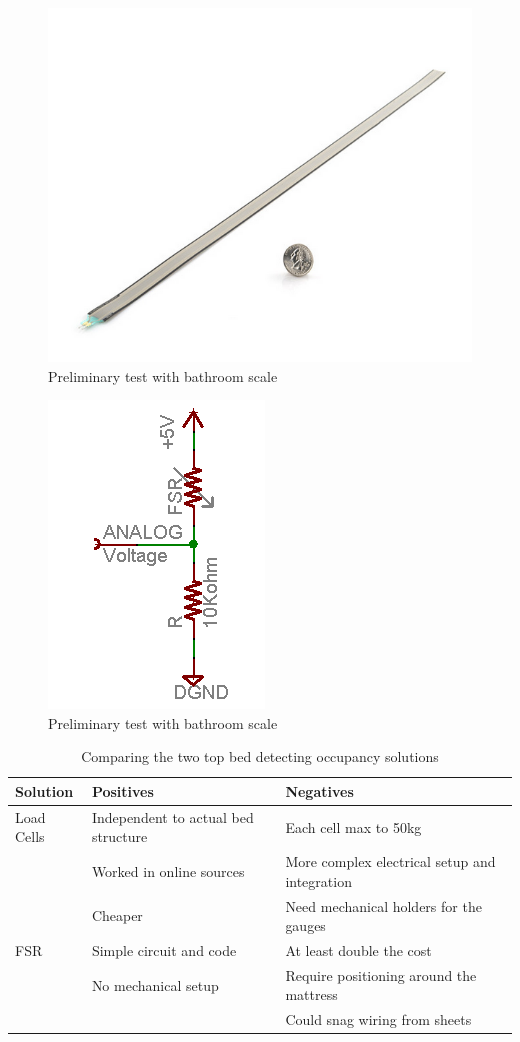 \documentclass[11pt]{article}
\begin{document}
\begin{figure}[H]
	\centering
	\includegraphics[width = 0.3\linewidth]{FSR}
	\caption{Preliminary test with bathroom scale}
	\label{fig:FSR}
\end{figure}
\begin{figure}[H]
	\centering
	\includegraphics[width = 0.2\linewidth]{FSRscem}
	\caption{Preliminary test with bathroom scale}
	\label{fig:FSRScem}
\end{figure}

\begin{table}[H]
	\centering
	\caption{Comparing the two top bed detecting occupancy solutions}
	\begin{tabular}{|l|l|l|}
		\hline
		Solution & Positives & Negatives \\
		\hline
		Load Cells &	\textbullet  Independent to actual bed structure & \textbullet Each cell max to 50kg \\
								&	\textbullet Worked in online sources& \textbullet More complex electrical setup and integration\\
								&	\textbullet Cheaper & \textbullet Need mechanical holders for the gauges\\
								
		\hline
		FSR & \textbullet Simple circuit and code &\textbullet At least double the cost \\
			& \textbullet No mechanical setup & \textbullet Require positioning around the mattress \\
			&&Could snag wiring from sheets\\
			\hline	
	\end{tabular}
\label{tab:solutionComparison}
\end{table} 
\end{document}
